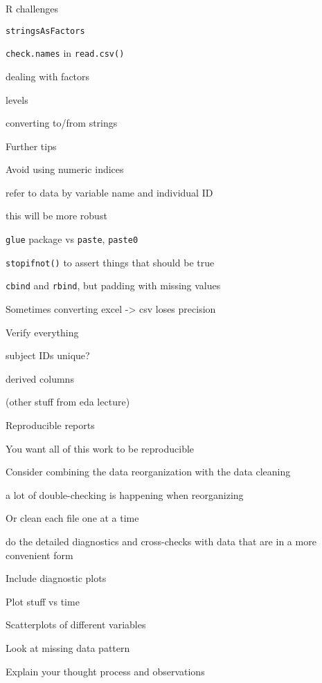 \documentclass[aspectratio=169,12pt,t]{beamer}
\begin{document}
\begin{frame}{R challenges}

  \bbi
\item {\tt stringsAsFactors}
\item {\tt check.names} in {\tt read.csv()}
\item dealing with factors
  \bi
\item levels
\item converting to/from strings
  \ei
  \ei

\end{frame}


\begin{frame}{Further tips}

\bbi
\item Avoid using numeric indices
  \bi
\item refer to data by variable name and individual ID
\item this will be more {\hilit robust}
  \ei
\item {\tt glue} package vs {\tt paste}, {\tt paste0}
\item {\tt stopifnot()} to assert things that should be true
\item {\tt cbind} and {\tt rbind}, but padding with missing values
\item Sometimes converting excel -> csv loses precision
  \ei

  \note{
  }
\end{frame}




\begin{frame}{Verify everything}

\bbi
\item subject IDs unique?
\item derived columns
\item (other stuff from eda lecture)
\ei

  \note{
  }
\end{frame}




\begin{frame}{Reproducible reports}

\bbi
\item You want all of this work to be reproducible
\item Consider combining the data reorganization with the data
  cleaning
  \bi
    \item a lot of double-checking is happening when reorganizing
  \ei
\item Or clean each file one at a time
  \bi
    \item do the detailed diagnostics and cross-checks with data that are
      in a more convenient form
  \ei
\item Include diagnostic plots
  \bi
    \item Plot stuff vs time
    \item Scatterplots of different variables
    \item Look at missing data pattern
  \ei
\item Explain your thought process and observations
  \ei

  \note{
  }
\end{frame}
\end{document}
